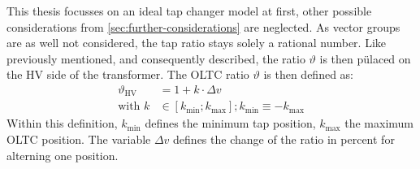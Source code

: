 This thesis focusses on an ideal tap changer model at first, other possible considerations from \autoref{sec:further-considerations} are neglected.
As vector groups are as well not considered, the tap ratio stays solely a rational number.
Like previously mentioned, and consequently described, the ratio $\vartheta$ is then pülaced on the \acs{HV} side of the transformer.
The \acs{OLTC} ratio $\vartheta$ is then defined as:
\begin{align}
        \vartheta_\mathrm{HV} &= 1 + k \cdot \Delta v \label{eq:tap-ratio-hv} \\[6pt]
        \text{with } k &\in [k_\mathrm{min};k_\mathrm{max}]; k_\mathrm{min} \equiv  -k_\mathrm{max} \label{eq:tap-pos}
\end{align}
Within this definition, $k_\mathrm{min}$ defines the minimum tap position, $k_\mathrm{max}$ the maximum \acs{OLTC} position. 
The variable $\Delta v$ defines the change of the ratio in percent for alterning one position.


